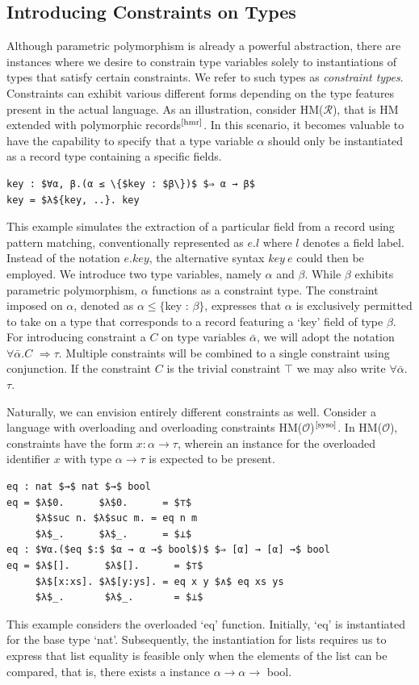 \documentclass[runningheads]{llncs}
\newcommand{\hmr}{HM($\mathcal{R}$)}
\newcommand{\hmo}{HM($\mathcal{O}$)}
\begin{document}
\subsection{Introducing Constraints on Types}
Although parametric polymorphism is already a powerful abstraction, there are
instances where we desire to constrain type variables solely to instantiations
of types that satisfy certain constraints.
We refer to such types as \emph{constraint types}.
Constraints can exhibit various different forms depending on the type features
present in the actual language.
As an illustration, consider \hmr{}, that is HM extended with
polymorphic records$^\text{\cite{hmr}}$.
In this scenario, it becomes valuable to have the capability to specify that a
type variable $α$
should only be instantiated as a record type containing a specific fields.
\begin{example}
  \begin{lstlisting}
key : $∀α, β.(α ≤ \{$key : $β\})$ $⇒ α → β$
key = $λ${key, ..}. key
  \end{lstlisting}
\end{example}
This example simulates the extraction of a particular field from a record using
pattern matching, conventionally represented as $e.l$ where $l$ denotes a field
label.
Instead of the notation $e.key$, the alternative syntax $key \ e$ could then be
employed.
We introduce two type variables, namely $α$ and $β$. While $β$ exhibits
parametric polymorphism, $α$ functions as a constraint type.
The constraint imposed on $α$, denoted as $α ≤ \{$key : $β\}$, expresses that
$α$ is exclusively permitted to take on a type that corresponds to a record
featuring a `key' field of type $β$.
For introducing constraint a $C$ on type variables $\bar{α}$, we will adopt the
notation $∀\bar{α}.C$ $⇒ τ$.
Multiple constraints will be combined to a single
constraint using conjunction. If the constraint $C$ is the trivial constraint
$⊤$ we may also write $∀\bar{α}.$ $τ$.

Naturally, we can envision entirely different constraints as well.
Consider a language with overloading and overloading constraints
\hmo{}$^\text{\cite{syso}}$.
In \hmo{}, constraints have the form $x : α → τ$,
wherein an instance for the overloaded identifier $x$ with type $α → τ$
is
expected to be present.
\begin{example}
  \begin{lstlisting}
eq : nat $→$ nat $→$ bool
eq = $λ$0.      $λ$0.      = $⊤$
     $λ$suc n. $λ$suc m. = eq n m 
     $λ$_.      $λ$_.      = $⊥$
eq : $∀α.($eq $:$ $α → α →$ bool$)$ $⇒ [α] → [α] →$ bool
eq = $λ$[].      $λ$[].      = $⊤$
     $λ$[x:xs]. $λ$[y:ys]. = eq x y $∧$ eq xs ys
     $λ$_.       $λ$_.       = $⊥$
  \end{lstlisting}
\end{example}
This example considers the overloaded `eq' function.
Initially, `eq' is instantiated for the base type `nat'.
Subsequently, the instantiation for lists requires us to express that
list
equality is feasible only when
the elements of the list can be compared, that is, there exists a
instance $α → α →$ bool.
\end{document}
